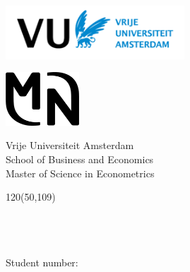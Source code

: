 \begin{titlepage}
\begin{center}
\begin{minipage}{0.5\linewidth}
    \centering
    \includegraphics[height=2cm]{figures/Vu logo.png}
\end{minipage}%
\begin{minipage}{0.5\linewidth}
    \centering
    \includegraphics[height=2cm]{figures/MN logo.png}
\end{minipage}

 \vspace*{10mm}
\large
Vrije Universiteit Amsterdam\\
School of Business and Economics\\
Master of Science in Econometrics\\


\vspace*{10cm}

\setlength{\TPHorizModule}{1mm}
\setlength{\TPVertModule}{\TPHorizModule}
\newlength{\backupparindent}
\setlength{\backupparindent}{\parindent}
\setlength{\parindent}{0mm}			
\begin{textblock}{120}(50,109)

    \vspace*{1mm}
    \huge
    \textbf{\doctitle \\}
    \Large
    \vspace*{5mm}
    \textit{\docsubtitle}\\
    \vspace*{10mm}
    \Large
    \me\\
    Student number: \stnumbr\\
    \vspace*{5cm}
   

\end{textblock}
\end{center}
\end{titlepage}
